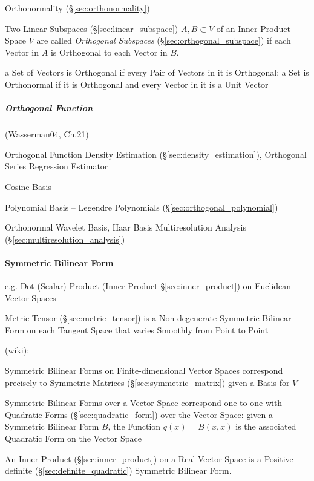 {{\fist Orthonormality (\S\ref{sec:orthonormality})

Two Linear Subspaces (\S\ref{sec:linear_subspace}) $A, B \subset V$ of an Inner
Product Space $V$ are called \emph{Orthogonal Subspaces}
(\S\ref{sec:orthogonal_subspace}) if each Vector in $A$ is Orthogonal to each
Vector in $B$.

a Set of Vectors is Orthogonal if every Pair of Vectors in it is Orthogonal; a
Set is Orthonormal if it is Orthogonal and every Vector in it is a Unit Vector



\subparagraph{Orthogonal Function}\label{sec:orthogonal_function}\hfill

(Wasserman04, Ch.21)

Orthogonal Function Density Estimation (\S\ref{sec:density_estimation}),
Orthogonal Series Regression Estimator

Cosine Basis

Polynomial Basis -- Legendre Polynomials (\S\ref{sec:orthogonal_polynomial})

Orthonormal Wavelet Basis, Haar Basis \fist Multiresolution Analysis
(\S\ref{sec:multiresolution_analysis})



\paragraph{Symmetric Bilinear Form}\label{sec:symmetric_bilinear}\hfill

e.g. Dot (Scalar) Product (Inner Product \S\ref{sec:inner_product}) on
Euclidean Vector Spaces

Metric Tensor (\S\ref{sec:metric_tensor}) is a Non-degenerate Symmetric Bilinear
Form on each Tangent Space that varies Smoothly from Point to Point

(wiki):

Symmetric Bilinear Forms on Finite-dimensional Vector Spaces correspond
precisely to Symmetric Matrices (\S\ref{sec:symmetric_matrix}) given a Basis
for $V$

Symmetric Bilinear Forms over a Vector Space correspond one-to-one with
Quadratic Forms (\S\ref{sec:quadratic_form}) over the Vector Space: given a
Symmetric Bilinear Form $B$, the Function $q(x) = B(x,x)$ is the associated
Quadratic Form on the Vector Space

An Inner Product (\S\ref{sec:inner_product}) on a Real Vector Space is
a Positive-definite (\S\ref{sec:definite_quadratic}) Symmetric
Bilinear Form.

}}
